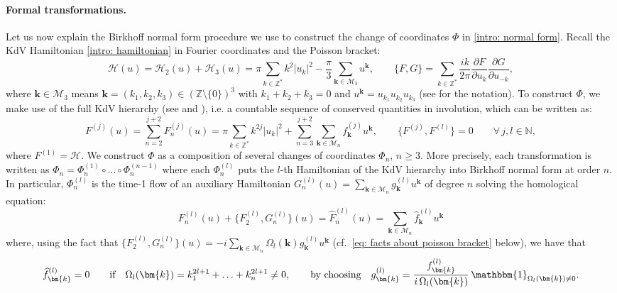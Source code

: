 \documentclass[a4paper,10pt,reqno]{article}
\theoremstyle{definition}
\theoremstyle{plain}
\theoremstyle{plain}
\theoremstyle{definition}
\theoremstyle{plain}
\theoremstyle{plain}
\theoremstyle{plain}
\theoremstyle{definition}
\theoremstyle{definition}
\def \N{\mathbb N}
\def \Z{\mathbb Z}
\def \pa{{\partial}}
\def \H{\mathcal{H}}
\def \M{\mathcal{M}}
\def \k{\bm{k}}
\begin{document}
\paragraph{Formal transformations.} Let us now explain the Birkhoff normal form procedure we use to construct the change of coordinates $\Phi$ in \eqref{intro: normal form}. Recall the KdV Hamiltonian \eqref{intro: hamiltonian} in Fourier coordinates and the Poisson bracket:
\begin{equation}
\H(u) = \H_2(u) + \H_3(u) = \pi \sum_{k \in \Z^*} k^2 |u_k|^2 - \frac{\pi}{3} \sum_{\k \in \M_3} u^{\k}, \qquad \{ F , G \} = \sum_{k \in \Z^*} \frac{ik}{2\pi} \frac{\pa F}{\pa u_k} \frac{\pa G}{\pa u_{-k}},
\label{intro: kdv hamiltonian in fourier}
\end{equation}
where $\k \in \M_3$ means $\k =(k_1,k_2,k_3)\in(\Z\setminus\{0\})^3$ with $k_1+k_2+k_3=0$ and $u^{\k}=u_{k_1} u_{k_2} u_{k_3}$
(see  for the notation).
To construct $\Phi$, we make use of the full KdV hierarchy (see \cite{lax,lax2,magri,rangointero} and ), i.e. a countable sequence of conserved quantities in involution, which can be written as:
\begin{equation}
F^{(j)}(u) = \sum_{n=2}^{j+2} F^{(j)}_n(u) = \pi \sum_{k \in \Z^*} k^{2j} |u_k|^2 + \sum_{n=3}^{j+2} \sum_{\k \in \M_n} f_{\k}^{(j)} u^{\k}, \qquad \{ F^{(j)} , F^{(l)} \} = 0 \qquad \forall \, j,l \in \N,
\label{intro: first integrals in fourier}
\end{equation}
where $F^{(1)}=\mathcal{H}$. We construct  $\Phi$ as a composition of several changes of coordinates $\Phi_n$, $n\geq 3$. More precisely, each transformation is written as  $\Phi_n=\Phi_n^{(1)} \circ \ldots \circ \Phi_n^{(n-1)}$ where each $\Phi_n^{(l)}$ puts the $l$-th Hamiltonian of the KdV hierarchy into Birkhoff normal form at order $n$. In particular, $\Phi_n^{(l)}$ is the time-1 flow of an auxiliary Hamiltonian $G_n^{(l)} (u) = \sum_{\k \in \M_n} g_{\k}^{(l)} u^{\k}$ of degree $n$ solving the homological equation:
\begin{equation}\label{intro:hom_eq}
F_n^{(l)}(u)+ \{ F_2^{(l)}, G_n^{(l)} \}(u) = \widehat{F}_n^{(l)}(u)=\sum_{\k \in \M_n} \widehat{f}_{\k}^{(l)} u^{\k} 
\end{equation}
where, using the fact that $ \{ F_2^{(l)}, G_n^{(l)} \}(u)=-i \sum_{\k \in \M_n} \Omega_{l}(\k) g_{\k}^{(l)} u^{\k}$ (cf.~\eqref{eq: facts about poisson bracket} below), we have that
\begin{equation}\label{intro:choice_G}
\widehat{f}_{\k}^{(l)}=0 \qquad \mbox{if}\quad \Omega_{l}(\k)=k_1^{2l+1} + \ldots + k_n^{2l+1} \neq 0, \qquad \mbox{by choosing}\quad  g_{\k}^{(l)} = \frac{f_{\k}^{(l)}}{i\,\Omega_{l}(\k)}\, \mathbbm{1}_{\Omega_{l}(\k)\neq 0}.
\end{equation}
\end{document}
